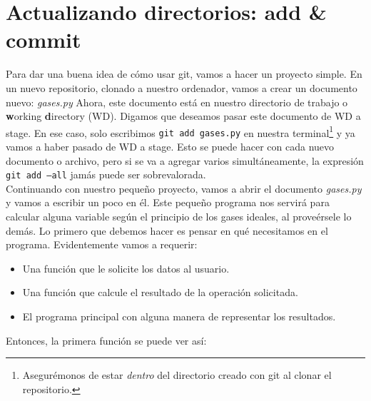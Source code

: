 \documentclass[10pt,letterpaper]{article}
\newcommand{\inlinecode}[1]{
\colorbox{light-gray}{\texttt{#1}}
}
\begin{document}
\section{Actualizando directorios: add \& commit}
Para dar una buena idea de c\'omo usar git, vamos a hacer un proyecto simple. En un nuevo repositorio, clonado a nuestro ordenador, vamos a crear un documento nuevo: \textit{gases.py} Ahora, este documento est\'a en nuestro directorio de trabajo o \textbf{w}orking \textbf{d}irectory (WD). Digamos que deseamos pasar este documento de WD a stage. En ese caso, solo escribimos \inlinecode{git add gases.py} en nuestra terminal\footnote{Asegur\'emonos de estar \emph{dentro} del directorio creado con git al clonar el repositorio.} y ya vamos a haber pasado de WD a stage. Esto se puede hacer con cada nuevo documento o archivo, pero si se va a agregar varios simult\'aneamente, la expresi\'on \inlinecode{git add --all} jam\'as puede ser sobrevalorada.\\

Continuando con nuestro peque\~no proyecto, vamos a abrir el documento \textit{gases.py} y vamos a escribir un poco en \'el. Este peque\~no programa nos servir\'a para calcular alguna variable seg\'un el principio de los gases ideales, al prove\'ersele lo dem\'as. Lo primero que debemos hacer es pensar en qu\'e necesitamos en el programa. Evidentemente vamos a requerir:

\begin{itemize}
\item Una funci\'on que le solicite los datos al usuario.
\item Una funci\'on que calcule el resultado de la operaci\'on solicitada.
\item El programa principal con alguna manera de representar los resultados.
\end{itemize}

Entonces, la primera funci\'on se puede ver as\'i:
\end{document}
